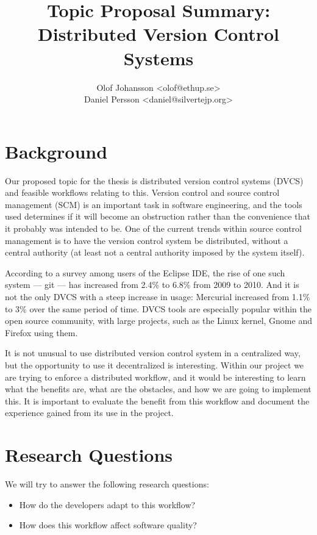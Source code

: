 \documentclass{article}
\title{Topic Proposal Summary: \\ Distributed Version Control Systems}
\author{
	Olof Johansson  \textless olof@ethup.se\textgreater \\
	Daniel Persson \textless daniel@silvertejp.org\textgreater
}
\begin{document}
\maketitle

\section{Background}

Our proposed topic for the thesis is distributed version control systems
(DVCS) and feasible workflows relating to this. Version control and
source control management (SCM) is an important task in software
engineering, and the tools used determines if it will become an
obstruction rather than the convenience that it probably was intended to
be. One of the current trends within source control management is to
have the version control system be distributed\cite{sink10}, without a
central authority (at least not a central authority imposed by the
system itself).

According to a survey among users of the Eclipse IDE\cite{eclipse10}, the 
rise of one such system --- git --- has increased from 2.4\% to 6.8\% from 
2009 to 2010. And it is not the only DVCS with a steep increase in usage: 
Mercurial increased from 1.1\% to 3\% over the same period of time. 
DVCS tools are especially popular within the open source community, 
with large projects, such as the Linux kernel\cite{kernel-git}, 
Gnome\cite{gnome-git} and Firefox\cite{firefox-hg} using them.

It is not unusual to use distributed version control system in a 
centralized way, but the opportunity to use it decentralized is 
interesting. Within our project we are trying to enforce a distributed 
workflow, and it would be interesting to learn what the benefits are, 
what are the obstacles, and how we are going to implement this. It is
important to evaluate the benefit from this workflow and document the
experience gained from its use in the project.

\section{Research Questions}

We will try to answer the following research questions:

\begin{itemize}
	\item How do the developers adapt to this workflow? 
	\item How does this workflow affect software quality?
\end{itemize}
\end{document}
